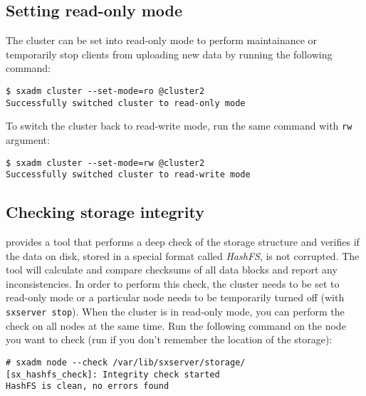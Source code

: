 \subsection{Setting read-only mode}
The cluster can be set into read-only mode to perform maintainance or
temporarily stop clients from uploading new data by running the following
command:
\begin{lstlisting}
$ sxadm cluster --set-mode=ro @cluster2
Successfully switched cluster to read-only mode
\end{lstlisting}
To switch the cluster back to read-write mode, run the same command with
\verb+rw+ argument:
\begin{lstlisting}
$ sxadm cluster --set-mode=rw @cluster2
Successfully switched cluster to read-write mode
\end{lstlisting}

\subsection{Checking storage integrity}
\SX provides a tool that performs a deep check of the storage structure
and verifies if the data on disk, stored in a special format called \textsl{HashFS},
is not corrupted. The tool will calculate and compare checksums of all
data blocks and report any inconsistencies. In order to perform this check,
the cluster needs to be set to read-only mode or a particular node needs to
be temporarily turned off (with \verb+sxserver stop+). When the cluster is
in read-only mode, you can perform the check on all nodes at the same time.
Run the following command on the node you want to check (run
 if you don't remember the location of the storage):
\begin{lstlisting}
# sxadm node --check /var/lib/sxserver/storage/
[sx_hashfs_check]: Integrity check started   
HashFS is clean, no errors found
\end{lstlisting}

